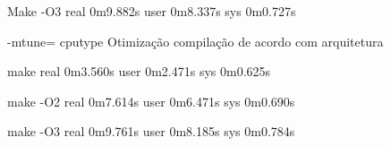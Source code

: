 \documentclass[11pt,a4paper]{article}
\begin{document}
Make -O3
real	0m9.882s
user	0m8.337s
sys	0m0.727s

-mtune= cpu\underline{}type 
Otimização compilação de acordo com arquitetura

make
real	0m3.560s
user	0m2.471s
sys	0m0.625s

make -O2
real	0m7.614s
user	0m6.471s
sys	0m0.690s

make -O3
real	0m9.761s
user	0m8.185s
sys	0m0.784s



   




\end{document}
